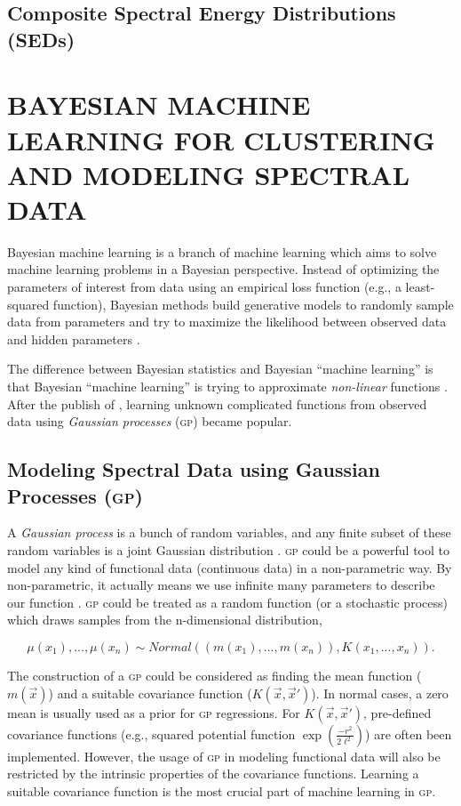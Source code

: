 \documentclass{ar-1col}
\begin{document}
\subsection{Composite Spectral Energy Distributions (SEDs)}

\section{BAYESIAN MACHINE LEARNING FOR CLUSTERING AND MODELING SPECTRAL DATA}

Bayesian machine learning is a branch of machine learning which aims to solve machine learning problems in a Bayesian perspective. 
Instead of optimizing the parameters of interest from data using an empirical loss function (e.g., a least-squared function), Bayesian methods build generative models to randomly sample data from parameters and try to maximize the likelihood between observed data and hidden parameters \citep{Barber2012}.

The difference between Bayesian statistics and Bayesian ``machine learning'' is that Bayesian ``machine learning'' is trying to approximate {\it non-linear} functions \citep{Bishop2003}. 
After the publish of \citet{Rasmussen2005}, learning unknown complicated functions from observed data using {\it Gaussian processes} (\textsc{gp}) became popular. 


\subsection{Modeling Spectral Data using Gaussian Processes (\textsc{gp})}

A {\it Gaussian process} is a bunch of random variables, and any finite subset of these random variables is a joint Gaussian distribution \citep{Rasmussen2005}. \textsc{gp} could be a powerful tool to model any kind of functional data (continuous data) in a non-parametric way. 
By non-parametric, it actually means we use infinite many parameters to describe our function \citep{Gelman04}. \textsc{gp} could be treated as a random function (or a stochastic process) which draws samples from the n-dimensional distribution, 

\begin{equation}
    \mu(x_1), ..., \mu(x_n) \sim Normal((m(x_1), ..., m(x_n)), K(x_1, ..., x_n)).
    \label{eq:GP}
\end{equation}

The construction of a \textsc{gp} could be considered as finding the mean function ($m(\vec x)$) and a suitable covariance function ($K(\vec x, \vec x')$). 
In normal cases, a zero mean is usually used as a prior for \textsc{gp} regressions. For $K(\vec x, \vec x')$, pre-defined covariance functions (e.g., squared potential function $\exp{(\frac{-r^2}{2 \ell^2})}$) are often been implemented. 
However, the usage of \textsc{gp} in modeling functional data will also be restricted by the intrinsic properties of the covariance functions.
Learning a suitable covariance function is the most crucial part of machine learning in \textsc{gp}.
\end{document}
